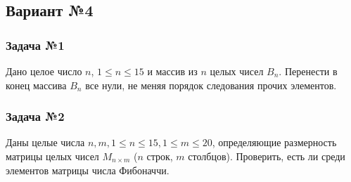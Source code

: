 \documentclass[12pt,a5paper,landscape]{article}
\begin{document}
\subsection*{Вариант №4}
\subsubsection*{Задача №1}
Дано целое число $n$, $1 \le n \le 15$ и массив из $n$ целых чисел $B_{n}$. Перенести в конец массива $B_n$ все нули, не меняя порядок следования прочих элементов.
\subsubsection*{Задача №2}
Даны целые числа $n, m, 1 \le n \le 15, 1 \le m \le 20$, определяющие размерность матрицы целых чисел $M_{n \times m}$ ($n$ строк, $m$ столбцов). Проверить, есть ли среди элементов матрицы числа Фибоначчи.
\end{document}
